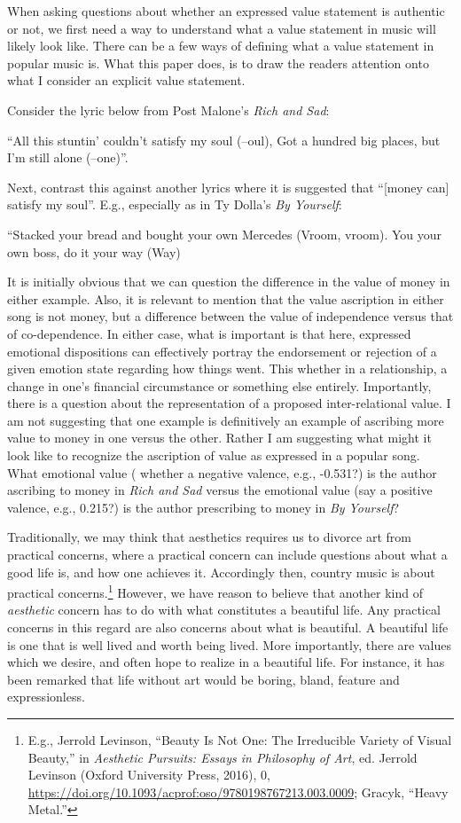 \documentclass[phdthesis,12pt,final]{wuthesis}
\theoremstyle{definition}
\theoremstyle{definition}
\theoremstyle{definition}
\theoremstyle{definition}
\theoremstyle{remark}
\begin{document}
When asking questions about whether an expressed value statement is authentic or not, we first need a way to understand what a value statement in music will likely look like. There can be a few ways of defining what a value statement in popular music is. What this paper does, is to draw the readers attention onto what I consider an explicit value statement.

Consider the lyric below from Post Malone's \emph{Rich and Sad}:

\label{stuntin}
``All this stuntin' couldn't satisfy my soul (--oul), Got a hundred big places, but I'm still alone (--one)''.

Next, contrast this against another lyrics where it is suggested that ``{[}money can{]} satisfy my soul''. E.g., especially as in Ty Dolla's \emph{By Yourself}:

\label{boss}
``Stacked your bread and bought your own Mercedes (Vroom, vroom). You your own boss, do it your way (Way)

It is initially obvious that we can question the difference in the value of money in either example. Also, it is relevant to mention that the value ascription in either song is not money, but a difference between the value of independence versus that of co-dependence. In either case, what is important is that here, expressed emotional dispositions can effectively portray the endorsement or rejection of a given emotion state regarding how things went. This whether in a relationship, a change in one's financial circumstance or something else entirely. Importantly, there is a question about the representation of a proposed inter-relational value. I am not suggesting that one example is definitively an example of ascribing more value to money in one versus the other. Rather I am suggesting what might it look like to recognize the ascription of value as expressed in a popular song. What emotional value ( whether a negative valence, e.g., -0.531?) is the author ascribing to money in \emph{Rich and Sad} versus the emotional value (say a positive valence, e.g., 0.215?) is the author prescribing to money in \emph{By Yourself}?

Traditionally, we may think that aesthetics requires us to divorce art from practical concerns, where a practical concern can include questions about what a good life is, and how one achieves it. Accordingly then, country music is about practical concerns.\footnote{E.g., Jerrold Levinson, {``Beauty Is {Not One}: {The Irreducible Variety} of {Visual Beauty},''} in \emph{Aesthetic {Pursuits}: {Essays} in {Philosophy} of {Art}}, ed. Jerrold Levinson (Oxford University Press, 2016), 0, \url{https://doi.org/10.1093/acprof:oso/9780198767213.003.0009}; Gracyk, {``Heavy Metal.''}} However, we have reason to believe that another kind of \emph{aesthetic} concern has to do with what constitutes a beautiful life. Any practical concerns in this regard are also concerns about what is beautiful. A beautiful life is one that is well lived and worth being lived. More importantly, there are values which we desire, and often hope to realize in a beautiful life. For instance, it has been remarked that life without art would be boring, bland, feature and expressionless.
\end{document}
